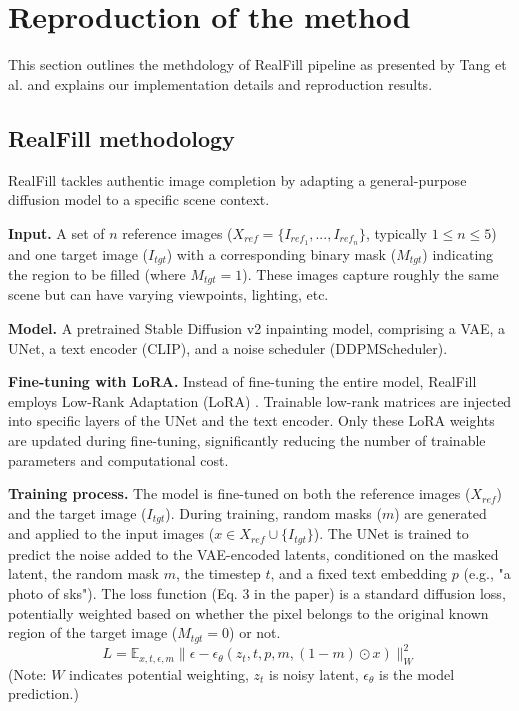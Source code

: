 \documentclass{article}
\begin{document}
\section{Reproduction of the method}
\label{sec:reproduction}
This section outlines the methdology of RealFill pipeline as presented by Tang et al. \cite{tang2024realfill} and explains our implementation details and reproduction results.

\subsection{RealFill methodology}
RealFill tackles authentic image completion by adapting a general-purpose diffusion model to a specific scene context.

\textbf{Input.} A set of $n$ reference images ($X_{ref} = \{I_{ref_1}, ..., I_{ref_n}\}$, typically $1 \le n \le 5$) and one target image ($I_{tgt}$) with a corresponding binary mask ($M_{tgt}$) indicating the region to be filled (where $M_{tgt}=1$). These images capture roughly the same scene but can have varying viewpoints, lighting, etc.

\textbf{Model.} A pretrained Stable Diffusion v2 inpainting model, comprising a VAE, a UNet, a text encoder (CLIP), and a noise scheduler (DDPMScheduler).

\textbf{Fine-tuning with LoRA.} Instead of fine-tuning the entire model, RealFill employs Low-Rank Adaptation (LoRA) \cite{hu2022lora}. Trainable low-rank matrices are injected into specific layers of the UNet and the text encoder. Only these LoRA weights are updated during fine-tuning, significantly reducing the number of trainable parameters and computational cost.

\textbf{Training process.} The model is fine-tuned on both the reference images ($X_{ref}$) and the target image ($I_{tgt}$). During training, random masks ($m$) are generated and applied to the input images ($x \in X_{ref} \cup \{I_{tgt}\}$). The UNet is trained to predict the noise added to the VAE-encoded latents, conditioned on the masked latent, the random mask $m$, the timestep $t$, and a fixed text embedding $p$ (e.g., "a photo of sks"). The loss function (Eq. 3 in the paper) is a standard diffusion loss, potentially weighted based on whether the pixel belongs to the original known region of the target image ($M_{tgt}=0$) or not.
\[
    L = \mathbb{E}_{x,t,\epsilon,m} \| \epsilon - \epsilon_\theta(z_t, t, p, m, (1 - m) \odot x) \|^2_W
\]
(Note: $W$ indicates potential weighting, $z_t$ is noisy latent, $\epsilon_\theta$ is the model prediction.)
\end{document}
